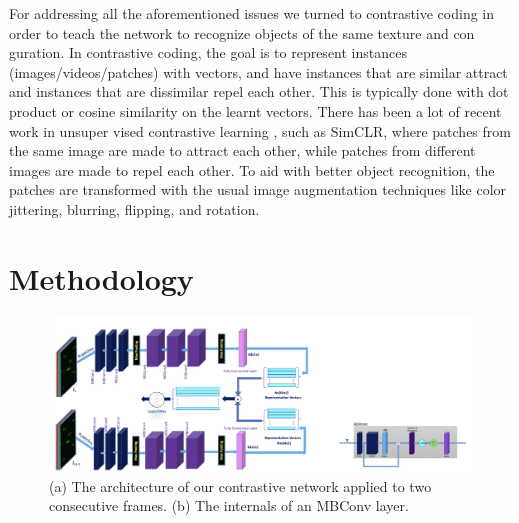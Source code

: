\documentclass[./dissertation.tex]{subfiles}
\begin{document}
For addressing all the aforementioned issues we turned to contrastive coding in order to teach the network to recognize objects of the same texture and con guration. In contrastive coding, the goal is to represent instances (images/videos/patches) with vectors, and have instances that are similar attract and instances that are dissimilar repel each other. This is typically done with dot product or cosine similarity on the learnt vectors. There has been a lot of recent work in unsuper vised contrastive learning \cite{oord2018representation,he2020momentum,chen2020improved}, such as SimCLR\cite{chen2020simple,chen2020big}, where patches from the same image are made to attract each other, while patches from different images are made to repel each other. To aid with better object recognition, the patches are transformed with the usual image augmentation techniques like color jittering, blurring, flipping, and rotation.






\label{Methodology}
\section{Methodology}
\begin{figure}
    \includegraphics[width=\textwidth]{./figures/cc/arch.png}
    \caption{(a) The architecture of our contrastive network applied to two consecutive frames. (b) The internals of an MBConv layer.} \label{fig:architecture}
\end{figure}
\end{document}

